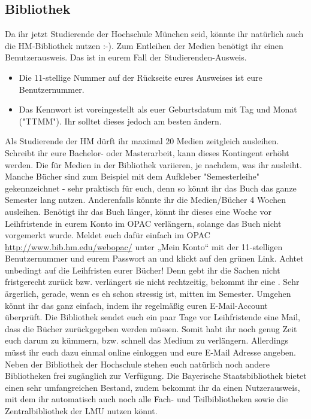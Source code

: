 \subsection{Bibliothek}
Da ihr jetzt Studierende der Hochschule München seid, könnte ihr 
natürlich auch die HM-Bibliothek nutzen :-).
Zum Entleihen der Medien benötigt ihr einen Benutzerausweis. Das ist 
in eurem Fall der Studierenden-Ausweis.
\begin{itemize}
\item Die 11-stellige Nummer auf der Rückseite eures Ausweises ist eure 
Benutzernummer. 
\item Das Kennwort ist voreingestellt als euer Geburtsdatum mit Tag und 
Monat ("TTMM"). Ihr solltet dieses jedoch am besten ändern. 
\end{itemize}
Als Studierende der HM dürft ihr maximal 20 Medien zeitgleich 
ausleihen. Schreibt ihr eure Bachelor- oder Masterarbeit, kann dieses 
Kontingent erhöht werden. Die  für Medien in der Bibliothek
variieren, je nachdem, was ihr ausleiht. Manche Bücher sind zum 
Beispiel mit dem Aufkleber "Semesterleihe" gekennzeichnet - sehr 
praktisch für euch, denn so könnt ihr das Buch das ganze Semester 
lang nutzen. Anderenfalls könnte ihr die Medien/Bücher 4 Wochen 
ausleihen. Benötigt ihr das Buch länger, könnt ihr dieses eine Woche 
vor Leihfristende in eurem Konto im OPAC verlängern, solange das 
Buch nicht vorgemerkt wurde. Meldet euch dafür einfach im OPAC \url{http://www.bib.hm.edu/webopac/}
unter „Mein Konto“ mit der 11-stelligen Benutzernummer und eurem 
Passwort an und klickt auf den grünen Link.\doublebreak
Achtet unbedingt auf die Leihfristen eurer Bücher! Denn gebt ihr die 
Sachen nicht fristgerecht zurück bzw. verlängert sie nicht rechtzeitig, 
bekommt ihr eine . Sehr ärgerlich,
gerade, wenn es eh schon stressig ist, mitten im Semester. \doublebreak
Umgehen könnt ihr das ganz einfach, indem ihr regelmäßig euren 
E-Mail-Account überprüft. Die Bibliothek sendet euch ein paar Tage 
vor Leihfristende eine Mail, dass die Bücher zurückgegeben werden 
müssen. Somit habt ihr noch genug Zeit euch darum zu kümmern, 
bzw. schnell das Medium zu verlängern. Allerdings müsst ihr euch dazu 
einmal online einloggen und eure E-Mail Adresse angeben.\doublebreak
Neben der Bibliothek der Hochschule stehen euch natürlich noch 
andere Bibliotheken frei zugänglich zur Verfügung. Die Bayerische 
Staatsbibliothek bietet einen sehr umfangreichen Bestand, zudem 
bekommt ihr da einen Nutzerausweis, mit dem ihr automatisch auch 
noch alle Fach- und Teilbibliotheken sowie die 
Zentralbibliothek der LMU nutzen könnt.